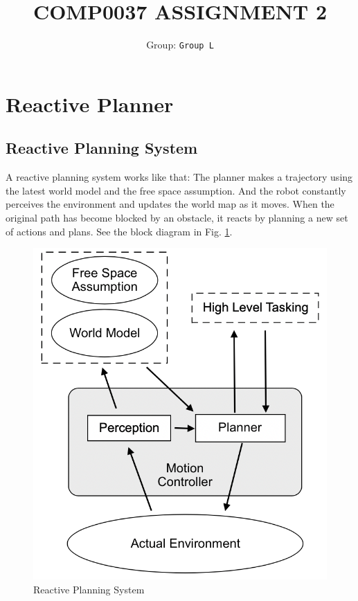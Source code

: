 \documentclass{article}
\title{COMP0037 ASSIGNMENT 2}
\author{
 Group: \texttt{Group L}\\
}
\begin{document}
\maketitle


\section{Reactive Planner}
\subsection {Reactive Planning System}

A reactive planning system works like that: The planner makes a trajectory using the latest world model and the free space assumption. And the robot constantly perceives the environment and updates the world map as it moves. When the original path has become blocked by an obstacle, it reacts by planning a new set of actions and plans. See the block diagram in Fig. \ref {fig:reactivePlanningSystem}.

\begin{figure}[ht]
\centering
\includegraphics[scale=0.5]{graphs/part1/reactivePlanningSystem.PNG}
\caption{Reactive Planning System}
\label{fig:reactivePlanningSystem}
\end{figure}
\end{document}
